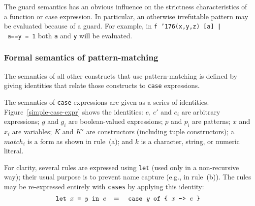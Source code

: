 The guard semantics has an obvious influence on the
strictness characteristics of a function or case expression.  In
particular, an otherwise irrefutable pattern
may be evaluated because of a guard.  For example, in
\bprog
\mbox{\tt f\ {\char'176}(x,y,z)\ [a]\ |\ a==y\ =\ 1}
\eprog
both \mbox{\tt a} and \mbox{\tt y} will be evaluated.


\subsubsection{Formal semantics of pattern-matching}
\label{case-semantics}

The semantics of all other constructs that use
pattern-matching is defined by giving identities that relate those constructs to
\mbox{\tt case} expressions.

The semantics of \mbox{\tt case} expressions are given as a series of
identities. Figure~\ref{simple-case-expr} shows the
identities:
$e$, $e'$ and $e_i$ are arbitrary expressions; 
$g$ and $g_i$ are boolean-valued expressions; 
$p$ and $p_i$ are patterns; 
$x$ and $x_i$ are variables; 
$K$ and $K'$ are constructors (including tuple constructors); 
a $match_i$ is a form as shown in rule~(a);
and $k$ is a character, string, or numeric literal.

For clarity, several rules are expressed using
\mbox{\tt let} (used only in a non-recursive way); their usual purpose is to
prevent name capture
(e.g., in rule~(b)).  The rules may be re-expressed entirely with
\mbox{\tt cases} by applying this identity:
\[
\mbox{$\it \makebox{\tt let\ }x\makebox{\tt \ =\ }y\makebox{\tt \ in\ }e\makebox{\tt \ }\ =\makebox{\tt \ \ case\ }y\makebox{\tt \ of\ {\char'173}\ }x\makebox{\tt \ ->\ }e\makebox{\tt \ {\char'175}}$}
\]

